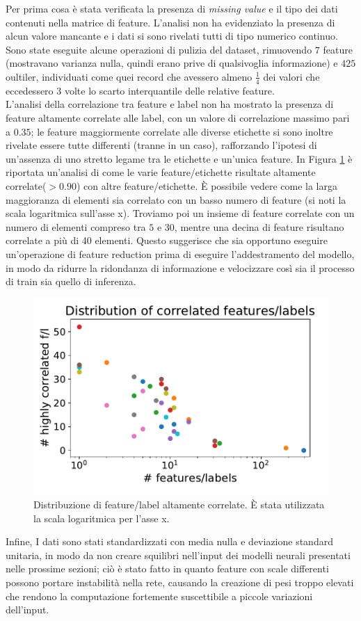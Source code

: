 Per prima cosa è stata verificata la presenza di \textit{missing value} e il tipo dei dati contenuti nella matrice di feature. L'analisi non ha evidenziato la presenza di alcun valore mancante e i dati si sono rivelati tutti di tipo numerico continuo.\\
Sono state eseguite alcune operazioni di pulizia del dataset, rimuovendo $7$ feature (mostravano varianza nulla, quindi erano prive di qualsivoglia informazione) e $425$ oultiler, individuati come quei record che avessero almeno $\frac{1}{4}$ dei valori che eccedessero $3$ volte lo scarto interquantile delle relative feature.\\
L'analisi della correlazione tra feature e label non ha mostrato la presenza di feature altamente correlate alle label, con un valore di correlazione massimo pari a $0.35$; le feature maggiormente correlate alle diverse etichette si sono inoltre rivelate essere tutte differenti (tranne in un caso), rafforzando l'ipotesi di un'assenza di uno stretto legame tra le etichette e un'unica feature.
In Figura \ref{fig:distributionhighcorr} è riportata un'analisi di come le varie feature/etichette risultate altamente correlate($> 0.90$) con altre feature/etichette. È possibile vedere come la larga maggioranza di elementi sia correlato con un basso numero di feature (si noti la scala logaritmica sull'asse x). Troviamo poi un insieme di feature correlate con un numero di elementi compreso tra $5$ e $30$, mentre una decina di feature risultano correlate a più di 40 elementi. Questo suggerisce che sia opportuno eseguire un'operazione di feature reduction prima di eseguire l'addestramento del modello, in modo da ridurre la ridondanza di informazione e velocizzare così sia il processo di train sia quello di inferenza.
\begin{figure}
	\centering
	\includegraphics[width=0.7\linewidth]{../images/pdf/distribution_high_corr}
	\caption{Distribuzione di feature/label altamente correlate. È stata utilizzata la scala logaritmica per l'asse x.}
	\label{fig:distributionhighcorr}
\end{figure}
Infine, I dati sono stati  standardizzati con media nulla e deviazione standard unitaria, in modo da non creare squilibri nell'input dei modelli neurali presentati nelle prossime sezioni; ciò è stato fatto in quanto feature con scale differenti possono portare instabilità nella rete, causando la creazione di pesi troppo elevati che rendono la computazione fortemente suscettibile a piccole variazioni dell'input.
